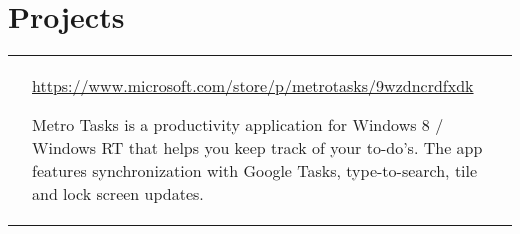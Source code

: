 \documentclass[12pt,a4paper,sans]{moderncv}        %
\makeatletter
\newcommand*{\para}{\vspace{.7ex}\newline}
\newcommand*{\project}[3]{
  \cvitem{\textbf{#1}}{
    \barelink{#2}
    \para
    #3
    }
}
\newcommand*{\barelink}[1]{\protect\href{#1}{#1}}
\newcommand*{\cvitemspace}{1em}
\renewcommand*{\cvitem}[3][\cvitemspace]{%
  \begin{tabular}{@{}p{\hintscolumnwidth}@{\hspace{\separatorcolumnwidth}}p{\maincolumnwidth}@{}}%
    \raggedleft\hintstyle{#2} &{#3}%
  \end{tabular}%
  \par\addvspace{#1}}
\makeatother
\begin{document}
\section{Projects}
\project{MetroTasks}{https://www.microsoft.com/store/p/metrotasks/9wzdncrdfxdk}{
  Metro Tasks is a productivity application for Windows 8 / Windows RT that
  helps you keep track of your to-do's. The app features synchronization with
  Google Tasks, type-to-search, tile and lock screen updates.
}
\end{document}
